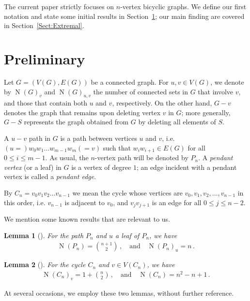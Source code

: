 \documentclass[a4paper,12pt]{amsart}
\newtheorem{lemma}{Lemma}
\theoremstyle{remark}
\DeclareMathOperator{\N}{N}
\begin{document}
\medskip
The current paper strictly focuses on $n$-vertex bicyclic graphs. We define our first notation and state some initial results in Section~\ref{ch:Prelimi}; our main finding are covered in Section~\ref{Sect:Extremal}.


\section{Preliminary} \label{ch:Prelimi}

Let $G=(V(G), E(G))$ be a connected graph. For $u,v \in V(G)$, we denote by $\N(G)_v$ and $\N(G)_{u,v}$ the number of connected sets in $G$ that involve $v$, and those that contain both $u$ and $v$, respectively. On the other hand, $G-v$ denotes the graph that remains upon deleting vertex $v$ in $G$; more generally, $G-S$ represents the graph obtained from $G$ by deleting all elements of $S$.

A $u-v$ path in $G$ is a path between vertices $u$ and $v$, i.e. $(u=)w_0 w_1 \ldots w_{m-1} w_m(=v)$ such that $w_i w_{i+1} \in E(G)$ for all $0\leq i \leq m-1$. As usual, the $n$-vertex path will be denoted by $P_n$. A \emph{pendant vertex} (or a leaf) in $G$ is a vertex of degree $1$; an edge incident with a pendant vertex is called a \emph{pendant edge}.

By $C_n= v_0v_1v_2\ldots v_{n-1}$ we mean the cycle whose vertices are $v_0,v_1,v_2,\ldots, v_{n-1}$ in this order, i.e. $v_{n-1}$ is adjacent to $v_0$, and $v_jv_{j+1}$ is an edge for all $0\leq j \leq n-2$.  

\medskip
We mention some known results that are relevant to us.

\begin{lemma}[\cite{Wang2005}]\label{PnPnu}
For the path $P_n$ and $u$ a leaf of $P_n$, we have
\begin{align*}
\N(P_n)=\binom{n+1}{2}\,, \quad \text{and} \quad \N(P_n)_u=n \,.
\end{align*}
\end{lemma}

\begin{lemma}[\cite{Audacegenral2018,AudaceGirth2018}]\label{cyclev}
For the cycle $C_n$ and $v\in V(C_n)$, we have
\begin{align*}
\N(C_n)_v=1+\binom{n}{2}\,, \quad \text{and} \quad \N(C_n)=n^2-n+1\,.
\end{align*}
\end{lemma}

\medskip
At several occasions, we employ these two lemmas, without further reference.
\end{document}
